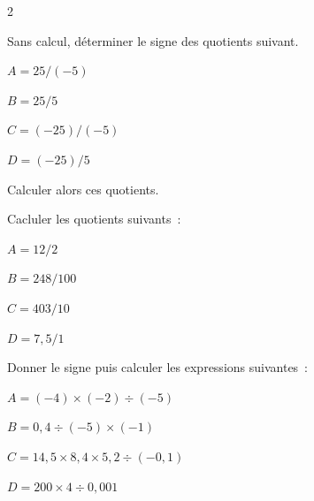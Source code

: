 \begin{multicols}{2}
    \begin{exercice}{}{}
        Sans calcul, déterminer le signe des quotients suivant.
        \begin{enumeratebf}
            \item $A=25 / (-5)$
            \item $B=25 / 5$
            \item $C=(-25) / (-5)$
            \item $D=(-25) / 5$
        \end{enumeratebf}
    Calculer alors ces quotients.
    \end{exercice}

\begin{exercice}{}{}
        Cacluler les quotients suivants~:

    \begin{enumeratebf}
        \item $A=12 / 2$
        \item $B=248 / 100$
        \item $C=403 / 10$
        \item $D=7,5 / 1$
    \end{enumeratebf}
\end{exercice}

\begin{exercice}{}{}
    Donner le signe puis calculer les expressions suivantes~:
    \begin{enumeratebf}
    \item $A=(-4)\times  (-2)÷(-5)$
    \item $B=0,4÷(-5)\times  (-1)$
    \item $C=14,5\times  8,4\times  5,2÷(-0,1)$
    \item $D=200\times  4÷0,001$
    \end{enumeratebf}

\end{exercice}
\end{multicols}